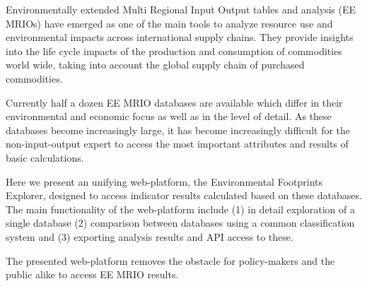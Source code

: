 Environmentally extended Multi Regional Input Output tables and analysis (EE MRIOs) have emerged as one of the main tools to analyze resource use and environmental impacts across international supply chains. They provide insights into the life cycle impacts of the production and consumption of commodities world wide, taking into account the global supply chain of purchased commodities.

Currently half a dozen EE MRIO databases are available which differ in their environmental and economic focus as well as in the level of detail. As these databases become increasingly large, it has become increasingly difficult for the non-input-output expert to access the most important attributes and results of basic calculations.

Here we present an unifying web-platform, the Environmental Footprints Explorer, designed to access indicator results calculated based on these databases. The main functionality of the web-platform include (1) in detail exploration of a single database (2) comparison between databases using a common classification system and (3) exporting analysis results and API access to these.

The presented web-platform removes the obstacle for policy-makers and the public alike to access EE MRIO results. 
